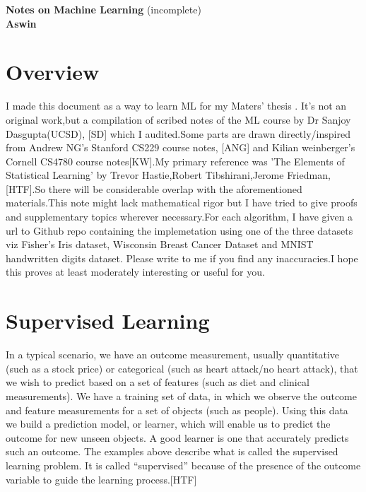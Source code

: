 \documentclass[12pt]{article}
\begin{document}
	
	   
	     
	
		\enlargethispage{2cm}
		
		\begin{center}
			
			\vspace*{-1cm}
			
			\textbf{\Large Notes on Machine Learning     }(incomplete)\\[10pt]
			

\textbf{\Large Aswin}\\ [8pt]			
			
			\end{center}
		
\cleardoublepage

\tableofcontents
\newpage

\section{Overview}

I made this document as a way to learn ML for my Maters' thesis . It’s not an original work,but a compilation of scribed notes of the ML course by Dr Sanjoy Dasgupta(UCSD), [SD] which I audited.Some parts are drawn directly/inspired from Andrew NG's Stanford CS229 course notes, [ANG] and Kilian weinberger's Cornell CS4780 course notes[KW].My primary reference was 'The Elements of Statistical Learning' by Trevor Hastie,Robert Tibshirani,Jerome Friedman, [HTF].So there will be considerable overlap with the aforementioned materials.This note might lack mathematical rigor but I have tried to give proofs and supplementary topics wherever necessary.For each algorithm, I have given a url to Github repo containing the implemetation using one of the three datasets viz Fisher's Iris dataset, Wisconsin Breast Cancer Dataset and MNIST handwritten digits dataset.
Please write to me if you find any inaccuracies.I hope this   proves at least moderately
interesting or useful for you.

\cleardoublepage

\section{Supervised Learning}

	In a typical scenario, we have an outcome measurement, usually quantitative (such as a stock price) or
categorical (such as heart attack/no heart attack), that we wish to predict
based on a set of features (such as diet and clinical measurements). We
have a training set of data, in which we observe the outcome and feature
measurements for a set of objects (such as people). Using this data we build
a prediction model, or learner, which will enable us to predict the outcome
for new unseen objects. A good learner is one that accurately predicts such
an outcome.
The examples above describe what is called the supervised learning problem. It is called “supervised” because of the presence of the outcome variable to guide the learning process.[HTF]
\end{document}
